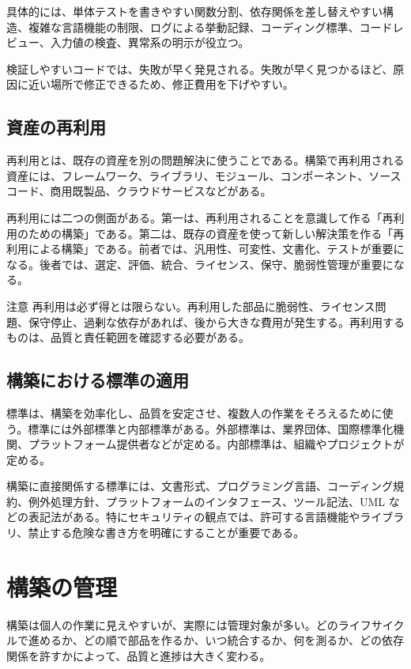 \documentclass[a4paper,11pt,ja=standard,xelatex]{bxjsarticle}
\begin{document}
具体的には、単体テストを書きやすい関数分割、依存関係を差し替えやすい構造、複雑な言語機能の制限、ログによる挙動記録、コーディング標準、コードレビュー、入力値の検査、異常系の明示が役立つ。

検証しやすいコードでは、失敗が早く発見される。失敗が早く見つかるほど、原因に近い場所で修正できるため、修正費用を下げやすい。

\subsection{資産の再利用}

再利用とは、既存の資産を別の問題解決に使うことである。構築で再利用される資産には、フレームワーク、ライブラリ、モジュール、コンポーネント、ソースコード、商用既製品、クラウドサービスなどがある。

再利用には二つの側面がある。第一は、再利用されることを意識して作る「再利用のための構築」である。第二は、既存の資産を使って新しい解決策を作る「再利用による構築」である。前者では、汎用性、可変性、文書化、テストが重要になる。後者では、選定、評価、統合、ライセンス、保守、脆弱性管理が重要になる。

\begin{keybox}{注意}
再利用は必ず得とは限らない。再利用した部品に脆弱性、ライセンス問題、保守停止、過剰な依存があれば、後から大きな費用が発生する。再利用するものは、品質と責任範囲を確認する必要がある。
\end{keybox}

\subsection{構築における標準の適用}

標準は、構築を効率化し、品質を安定させ、複数人の作業をそろえるために使う。標準には外部標準と内部標準がある。外部標準は、業界団体、国際標準化機関、プラットフォーム提供者などが定める。内部標準は、組織やプロジェクトが定める。

構築に直接関係する標準には、文書形式、プログラミング言語、コーディング規約、例外処理方針、プラットフォームのインタフェース、ツール記法、UML などの表記法がある。特にセキュリティの観点では、許可する言語機能やライブラリ、禁止する危険な書き方を明確にすることが重要である。

\section{構築の管理}

構築は個人の作業に見えやすいが、実際には管理対象が多い。どのライフサイクルで進めるか、どの順で部品を作るか、いつ統合するか、何を測るか、どの依存関係を許すかによって、品質と進捗は大きく変わる。
\end{document}

